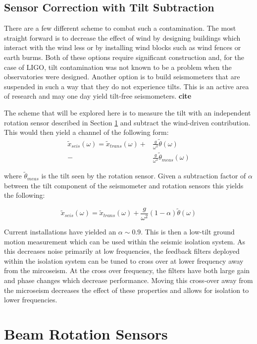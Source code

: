\documentclass [12pt, proquest]{uwthesis}[2019]
\begin{document}
\subsection{Sensor Correction with Tilt Subtraction}

\quad There are a few different scheme to combat such a contamination. The most straight forward is to decrease the effect of wind by designing buildings which interact with the wind less or by installing wind blocks such as wind fences or earth burms. Both of these options require significant construction and, for the case of LIGO, tilt contamination was not known to be a problem when the observatories were designed. Another option is to build seismometers that are suspended in such a way that they do not experience tilts. This is an active area of research and may one day yield tilt-free seismometers. \textbf{cite}

The scheme that will be explored here is to measure the tilt with an independent rotation sensor described in Section \ref{BRSSec} and subtract the wind-driven contribution. This would then yield a channel of the following form:
\begin{align}
\tilde{x}_{seis}(\omega)=\tilde{x}_{trans}(\omega)+&\frac{g}{\omega^2}\tilde{\theta}(\omega)\\
-&\frac{g}{\omega^2}\tilde{\theta}_{meas}(\omega)
\end{align}

where $\tilde{\theta}_{meas}$ is the tilt seen by the rotation sensor. Given a subtraction factor of $\alpha$ between the tilt component of the seismometer and rotation sensors this yields the following:

\[\tilde{x}_{seis}(\omega)=\tilde{x}_{trans}(\omega)+\frac{g}{\omega^2}(1-\alpha)\tilde{\theta}(\omega)\]

Current installations have yielded an $\alpha\sim 0.9$. This is then a low-tilt ground motion measurement which can be used within the seismic isolation system. As this decreases noise primarily at low frequencies, the feedback filters deployed within the isolation system can be tuned to cross over at lower frequency away from the mircoseism. At the cross over frequency, the filters have both large gain and phase changes which decrease performance. Moving this cross-over away from the microseism decreases the effect of these properties and allows for isolation to lower frequencies.

\section{Beam Rotation Sensors} \label{BRSSec}
\end{document}
